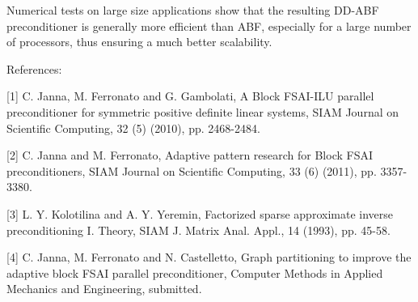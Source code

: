 \documentclass{report}
\begin{document}
Numerical tests on large size applications show that the resulting DD-ABF
preconditioner is generally
more efficient than ABF, especially for a large number of processors,
thus ensuring a much better scalability.

\vspace{1cm}

References:

[1] C. Janna, M. Ferronato and G. Gambolati, A Block FSAI-ILU parallel preconditioner
for symmetric positive definite linear systems, SIAM Journal on
Scientific Computing, 32 (5) (2010),
pp. 2468-2484.

[2] C. Janna and M. Ferronato, Adaptive pattern research for Block FSAI preconditioners,
SIAM Journal on Scientific Computing, 33 (6) (2011), pp. 3357-3380.

[3] L. Y. Kolotilina and A. Y. Yeremin, Factorized sparse approximate
inverse preconditioning
I. Theory, SIAM J. Matrix Anal. Appl., 14 (1993), pp. 45-58.

[4] C. Janna, M. Ferronato and N. Castelletto, Graph partitioning to
improve the adaptive block
FSAI parallel preconditioner, Computer Methods in Applied Mechanics and
Engineering, submitted.
\end{document}
